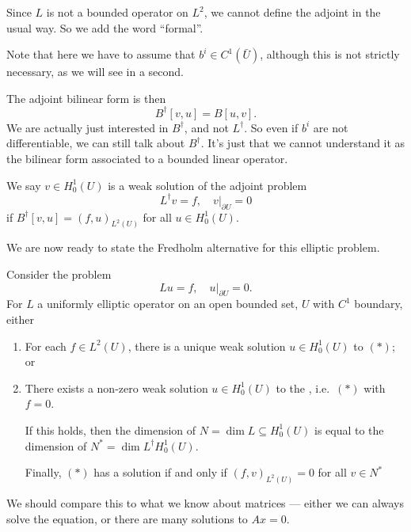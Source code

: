 \documentclass[a4paper]{article}
\begin{document}
Since $L$ is not a bounded operator on $L^2$, we cannot define the adjoint in the usual way. So we add the word ``formal''.

Note that here we have to assume that $b^i \in C^1(\bar{U})$, although this is not strictly necessary, as we will see in a second.

The adjoint bilinear form is then
\[
  B^\dagger[v, u] = B[u, v].
\]
We are actually just interested in $B^\dagger$, and not $L^\dagger$. So even if $b^i$ are not differentiable, we can still talk about $B^\dagger$. It's just that we cannot understand it as the bilinear form associated to a bounded linear operator.

We say $v \in H_0^1(U)$ is a weak solution of the adjoint problem
\[
  L^\dagger v = f,\quad v|_{\partial U} = 0
\]
if $B^\dagger[v, u] = (f, u)_{L^2(U)}$ for all $u \in H_0^1(U)$.

We are now ready to state the Fredholm alternative for this elliptic problem.
\begin{thm}
  Consider the problem
  \[
    Lu = f,\quad u|_{\partial U} = 0.\tag{$*$}
  \]
  For $L$ a uniformly elliptic operator on an open bounded set, $U$ with $C^1$ boundary, either
  \begin{enumerate}
    \item For each $f \in L^2(U)$, there is a unique weak solution $u \in H_0^1(U)$ to $(*)$; or
    \item There exists a non-zero weak solution $u \in H_0^1(U)$ to the , i.e.\ $(*)$ with $f = 0$.

      If this holds, then the dimension of $N = \dim L \subseteq H_0^1(U)$ is equal to the dimension of $N^* = \dim L^\dagger H_0^1(U)$.

      Finally, $(*)$ has a solution if and only if $(f, v)_{L^2(U)} = 0$ for all $v \in N^*$
  \end{enumerate}
\end{thm}
We should compare this to what we know about matrices --- either we can always solve the equation, or there are many solutions to $Ax = 0$.
\end{document}
